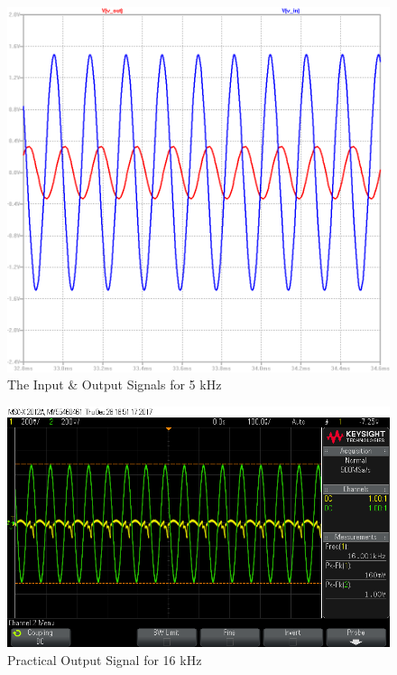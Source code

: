 \documentclass[paper]{IEEEtran}
\begin{document}
\begin{figure}[h!]
	\setlength{\unitlength}{\textwidth}
	\center 
	\includegraphics[width=0.45\unitlength]{lpf_op5.png}
	\caption{\label{fig:lpfop5}The Input \& Output Signals for 5 kHz}
\end{figure} 





\begin{figure}[h!]
	\setlength{\unitlength}{\textwidth}
	\center 
	\includegraphics[width=0.45\unitlength]{lpf_osc2.png}
	\caption{\label{fig:lpfosc2}Practical Output Signal for 16 kHz}
\end{figure} 
	
\end{document}
